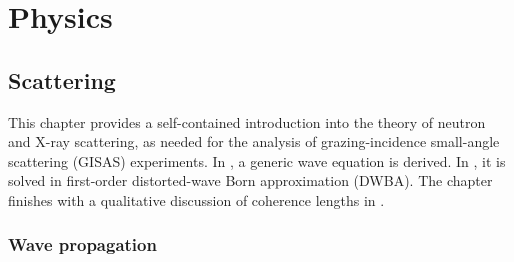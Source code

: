 
\def\Do{\overset{o}{D}}
\def\Go{\overset{o}{G}}
\def\TD{\TENS{D}}
\def\Td{\TENS{\delta}}
\def\TG{\TENS{G}}
\def\TU{\TENS{U}}
\def\TV{\TENS{V}}
\def\TL{\TENS{\Lambda}}
\def\TDo{\TENS{\overset{o}{D}}}
\def\TGo{\TENS{\overset{o}{G}}}
\def\vGo{\v{\overset{o}{G}}\vphantom{\v{G}}}
\def\Psio{\v{\overset{o}{\Psi}}\vphantom{\Psi}}
\def\ue{\v{\hat u}}

\def\pfo{\overset{o}{\psi}_\sf}
\def\pfoc{\overset{o}{\psi}\vphantom{\psi}^*_\sf}

%

\part{Physics}\label{PPHYS}

\chapter{Scattering}  \label{SSca}

This chapter provides a self-contained introduction
into the theory of neutron and X-ray scattering,
as needed for the analysis of grazing-incidence small-angle scattering (GISAS) experiments.
%
%
%
In ,
a generic wave equation is derived.
In ,
it is solved in first-order distorted-wave Born approximation (DWBA).
%
%
The chapter finishes with a qualitative discussion
of coherence lengths in .


\section{Wave propagation}\label{Swave}
%

